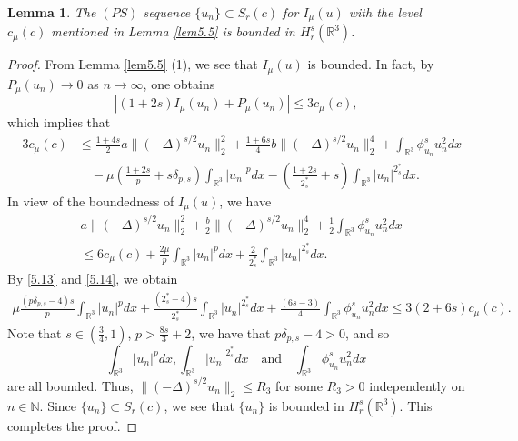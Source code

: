 \documentclass[11pt]{article}
\numberwithin{equation}{section}
\newtheorem{lemma}[theorem]{Lemma}
\begin{document}
\begin{lemma}\label{lem5.6} 
The $(PS)$ sequence $\{u_n\} \subset S_{r}(c)$ for $I_\mu(u)$ with the level 
$c_\mu(c)$ mentioned in Lemma \ref{lem5.5} is bounded in $H^s_r(\mathbb{R}^3)$.
\end{lemma}

\begin{proof}  
From Lemma  \ref{lem5.5} (1), we see that $I_\mu(u)$ is bounded. 
In fact, by $P_\mu(u_n)\to 0$ as $n\to \infty$, one obtains
$$
|(1+2s)I_\mu(u_n)+P_\mu(u_n)|\leq 3c_\mu(c),
$$
which implies that
\begin{equation}\label{5.13}
\begin{split}
-3c_\mu(c)&\leq \frac{1+4s}{2}a\|(-\Delta)^{s/2}u_n\|^2_2+\frac{1+6s}{4}b
\|(-\Delta)^{s/2}u_n\|^4_2+\int_{\mathbb{R}^3}\phi^s_{u_n}u^2_ndx\\
&\quad -\mu(\frac{1+2s}{p}+s\delta_{p,s})\int_{\mathbb{R}^3}|u_n|^pdx
 -(\frac{1+2s}{2^*_s}+s)\int_{\mathbb{R}^3}|u_n|^{2^*_s}dx.
\end{split}
\end{equation}
In view of the boundedness of $I_\mu(u)$, we have
\begin{equation}\label{5.14}
\begin{split}
&a\|(-\Delta)^{s/2}u_n\|^2_2+\frac{b}{2}\|(-\Delta)^{s/2}u_n\|^4_2
 +\frac{1}{2}\int_{\mathbb{R}^3}\phi^s_{u_n}u^2_ndx\\
&\leq 6c_\mu(c)+\frac{2\mu}{p}\int_{\mathbb{R}^3}|u_n|^pdx
 +\frac{2}{2^*_s}\int_{\mathbb{R}^3}|u_n|^{2^*_s}dx.
\end{split}
\end{equation}
By \eqref{5.13} and \eqref{5.14}, we obtain
\begin{align*} %
\mu \frac{(p\delta_{p,s}-4)s}{p}\int_{\mathbb{R}^3}|u_n|^pdx
+\frac{(2^*_s-4)s}{2^*_s}\int_{\mathbb{R}^3}|u_n|^{2^*_s}dx
+\frac{(6s-3)}{4}\int_{\mathbb{R}^3}\phi^s_{u_n}u^2_ndx\leq 3(2+6s)c_\mu(c).
\end{align*}
Note that $s\in(\frac{3}{4}, 1)$, $p>\frac{8s}{3}+2$, we have that 
$p\delta_{p,s}-4>0$, and so
$$
\int_{\mathbb{R}^3}|u_n|^pdx, \int_{\mathbb{R}^3}|u_n|^{2^*_s}dx 
\quad\text{and}\quad
\int_{\mathbb{R}^3}\phi^s_{u_n}u^2_ndx 
$$
are all bounded. Thus, $\|(-\Delta)^{s/2}u_n\|_2\leq R_3$ for some $R_3>0$ 
independently on $n\in \mathbb{N}$. Since $\{u_n\}\subset S_{r}(c)$, we see that 
$\{u_n\}$ is bounded in $H^s_r(\mathbb{R}^3)$.  
This completes the proof.
\end{proof}
\end{document}
